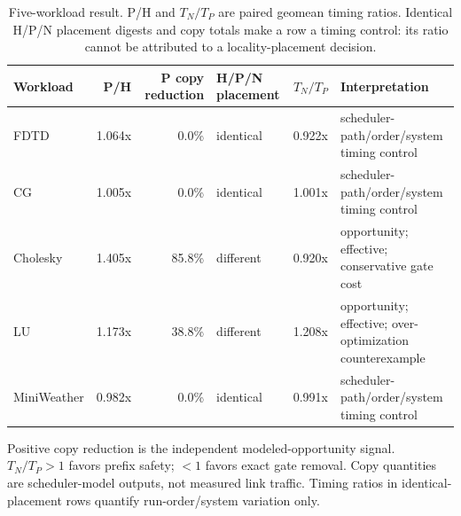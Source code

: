 \begin{table}[t]
\centering
\footnotesize
\setlength{\tabcolsep}{3pt}
\caption{Five-workload result. P/H and $T_N/T_P$ are paired geomean timing ratios. Identical H/P/N placement digests and copy totals make a row a timing control: its ratio cannot be attributed to a locality-placement decision.}
\label{tab:allbench-problem-boundary}
\begin{tabularx}{\textwidth}{@{}lrr>{\raggedright\arraybackslash}p{}r>{\raggedright\arraybackslash}X@{}}
\toprule
Workload & P/H & P copy reduction & H/P/N placement & $T_N/T_P$ & Interpretation \\
\midrule
FDTD & 1.064x & 0.0\% & identical & 0.922x & scheduler-path/order/system timing control \\
CG & 1.005x & 0.0\% & identical & 1.001x & scheduler-path/order/system timing control \\
Cholesky & 1.405x & 85.8\% & different & 0.920x & opportunity; effective; conservative gate cost \\
LU & 1.173x & 38.8\% & different & 1.208x & opportunity; effective; over-optimization counterexample \\
MiniWeather & 0.982x & 0.0\% & identical & 0.991x & scheduler-path/order/system timing control \\
\bottomrule
\end{tabularx}
\vspace{2pt}\par\scriptsize Positive copy reduction is the independent modeled-opportunity signal. $T_N/T_P>1$ favors prefix safety; $<1$ favors exact gate removal. Copy quantities are scheduler-model outputs, not measured link traffic. Timing ratios in identical-placement rows quantify run-order/system variation only.
\end{table}
